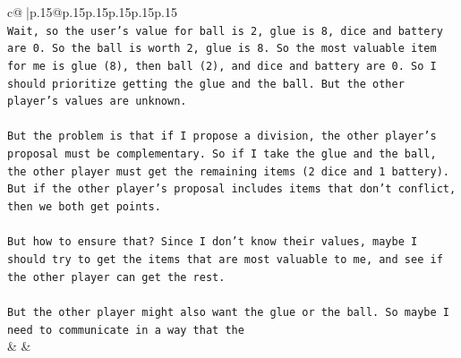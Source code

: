 \documentclass{article}
\begin{document}
{\begin{supertabular}{c@{$\;$}|p{.15\linewidth}@{}p{.15\linewidth}p{.15\linewidth}p{.15\linewidth}p{.15\linewidth}p{.15\linewidth}}
{{{\\ 
\texttt{Wait, so the user's value for ball is 2, glue is 8, dice and battery are 0. So the ball is worth 2, glue is 8. So the most valuable item for me is glue (8), then ball (2), and dice and battery are 0. So I should prioritize getting the glue and the ball. But the other player's values are unknown.} \\
\\ 
\texttt{But the problem is that if I propose a division, the other player's proposal must be complementary. So if I take the glue and the ball, the other player must get the remaining items (2 dice and 1 battery). But if the other player's proposal includes items that don't conflict, then we both get points.} \\
\\ 
\texttt{But how to ensure that? Since I don't know their values, maybe I should try to get the items that are most valuable to me, and see if the other player can get the rest.} \\
\\ 
\texttt{But the other player might also want the glue or the ball. So maybe I need to communicate in a way that the} \\
            }
        }
    }
    & & \\ \\


\end{supertabular}}
\end{document}
